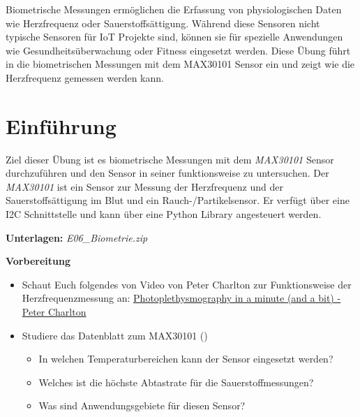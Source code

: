 \documentclass[
  11pt,
  a4paperpaper,
  oneside, openany  ,captions=tableheading
]{scrbook}
\providecommand{\tightlist}{%
  \setlength{\itemsep}{0pt}\setlength{\parskip}{0pt}}
\theoremstyle{definition}
\theoremstyle{remark}
\begin{document}
Biometrische Messungen ermöglichen die Erfassung von physiologischen
Daten wie Herzfrequenz oder Sauerstoffsättigung. Während diese Sensoren
nicht typische Sensoren für IoT Projekte sind, können sie für spezielle
Anwendungen wie Gesundheitsüberwachung oder Fitness eingesetzt werden.
Diese Übung führt in die biometrischen Messungen mit dem MAX30101 Sensor
ein und zeigt wie die Herzfrequenz gemessen werden kann.

\hfill\break

\section{Einführung}\label{einfuxfchrung-5}

Ziel dieser Übung ist es biometrische Messungen mit dem \emph{MAX30101}
Sensor durchzuführen und den Sensor in seiner funktionsweise zu
untersuchen. Der \emph{MAX30101} ist ein Sensor zur Messung der
Herzfrequenz und der Sauerstoffsättigung im Blut und ein
Rauch-/Partikelsensor. Er verfügt über eine I2C Schnittstelle und kann
über eine Python Library angesteuert werden.

\textbf{Unterlagen:} \emph{ E06\_Biometrie.zip}

\textbf{Vorbereitung}

\begin{itemize}
\tightlist
\item
  Schaut Euch folgendes von Video von Peter Charlton zur Funktionsweise
  der Herzfrequenzmessung an:
  \href{https://www.youtube.com/embed/HnXDvN4WNX8?si=EeIAlSWW2Z1SJBof}{Photoplethysmography
  in a minute (and a bit) - Peter Charlton}
\item
  Studiere das Datenblatt zum MAX30101
  ()

  \begin{itemize}
  \tightlist
  \item
    In welchen Temperaturbereichen kann der Sensor eingesetzt werden?
  \item
    Welches ist die höchste Abtastrate für die Sauerstoffmessungen?
  \item
    Was sind Anwendungsgebiete für diesen Sensor?
  \end{itemize}
\end{itemize}
\end{document}
